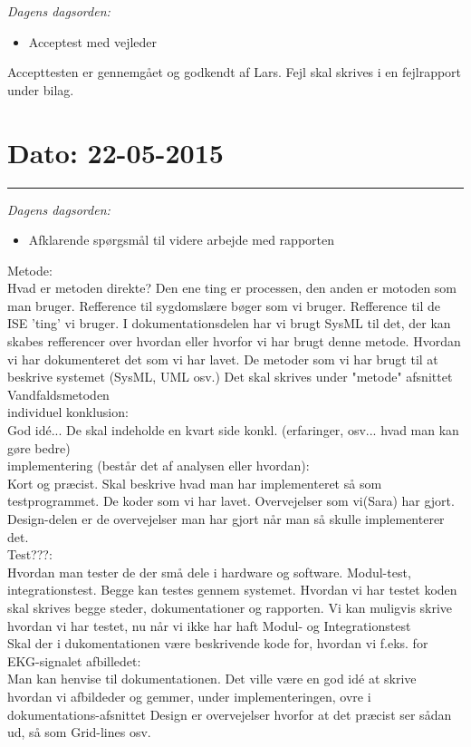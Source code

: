 \textit{Dagens dagsorden:}
\begin{itemize}
	\item Acceptest med vejleder
\end{itemize}
Accepttesten er gennemgået og godkendt af Lars.
Fejl skal skrives i en fejlrapport under bilag.

 
\section{Dato: 22-05-2015}
\hrule
\textit{Dagens dagsorden:}
\begin{itemize}
	\item Afklarende spørgsmål til videre arbejde med rapporten
\end{itemize}

Metode:\\
Hvad er metoden direkte? Den ene ting er processen, den anden er motoden som man bruger.
Refference til sygdomslære bøger som vi bruger.
Refference til de ISE 'ting' vi bruger.
I dokumentationsdelen har vi brugt SysML til det, der kan skabes refferencer over hvordan eller hvorfor vi har brugt denne metode. 
Hvordan vi har dokumenteret det som vi har lavet. De metoder som vi har brugt til at beskrive systemet (SysML, UML osv.)
Det skal skrives under "metode" afsnittet
Vandfaldsmetoden
\\ 

individuel konklusion:\\
God idé... De skal indeholde en kvart side konkl. (erfaringer, osv... hvad man kan gøre bedre) 
\\ 

implementering (består det af analysen eller hvordan):\\
Kort og præcist. Skal beskrive hvad man har implementeret så som testprogrammet. De koder som vi har lavet. Overvejelser som vi(Sara) har gjort.
Design-delen er de overvejelser man har gjort når man så skulle implementerer det.
\\
Test???:\\
Hvordan man tester de der små dele i hardware og software. 
Modul-test, integrationstest. Begge kan testes gennem systemet. Hvordan vi har testet koden skal skrives begge steder, dokumentationer og rapporten. 
Vi kan muligvis skrive hvordan vi har testet, nu når vi ikke har haft Modul- og Integrationstest
\\ 
 
Skal der i dukomentationen være beskrivende kode for, hvordan vi f.eks. for EKG-signalet afbilledet:\\
Man kan henvise til dokumentationen. Det ville være en god idé at skrive hvordan vi afbildeder og gemmer, under implementeringen, ovre i dokumentations-afsnittet
Design er overvejelser hvorfor at det præcist ser sådan ud, så som Grid-lines osv.
\\  

